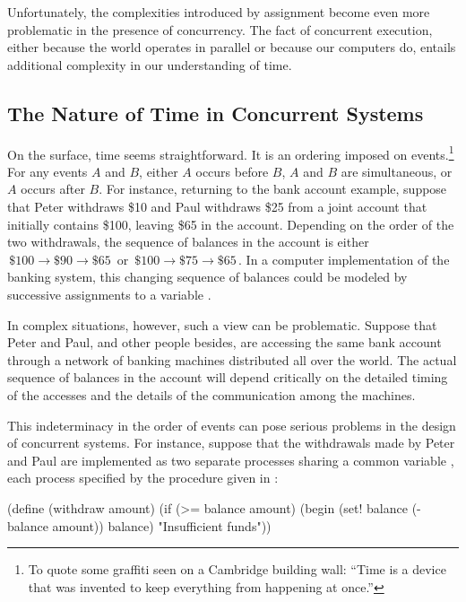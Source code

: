 Unfortunately, the complexities introduced by assignment become even more
problematic in the presence of concurrency.  The fact of concurrent execution,
either because the world operates in parallel or because our computers do,
entails additional complexity in our understanding of time.



\subsection{The Nature of Time in Concurrent Systems}
\label{Section 3.4.1}

On the surface, time seems straightforward.  It is an ordering imposed on
events.\footnote{To quote some graffiti seen on a Cambridge building wall:
``Time is a device that was invented to keep everything from happening at
once.''}  For any events \( A \) and \( B \), either \( A \) occurs before \( B \),
\( A \) and \( B \) are simultaneous, or \( A \) occurs after \( B \).  For instance,
returning to the bank account example, suppose that Peter withdraws \$10 and
Paul withdraws \$25 from a joint account that initially contains \$100, leaving
\$65 in the account.  Depending on the order of the two withdrawals, the
sequence of balances in the account is either \( \,\$100 \to \$90 \to \$65\, \) or \( \,\$100 \to \$75
\to \$65\, \).  In a computer implementation of the banking system, this changing
sequence of balances could be modeled by successive assignments to a variable
.

In complex situations, however, such a view can be problematic.  Suppose that
Peter and Paul, and other people besides, are accessing the same bank account
through a network of banking machines distributed all over the world.  The
actual sequence of balances in the account will depend critically on the
detailed timing of the accesses and the details of the communication among the
machines.

This indeterminacy in the order of events can pose serious problems in the
design of concurrent systems.  For instance, suppose that the withdrawals made
by Peter and Paul are implemented as two separate processes sharing a common
variable , each process specified by the procedure given in
:

\begin{codeBlock}
(define (withdraw amount)
  (if (>= balance amount)
      (begin
        (set! balance (- balance amount))
        balance)
      "Insufficient funds"))
\end{codeBlock}

